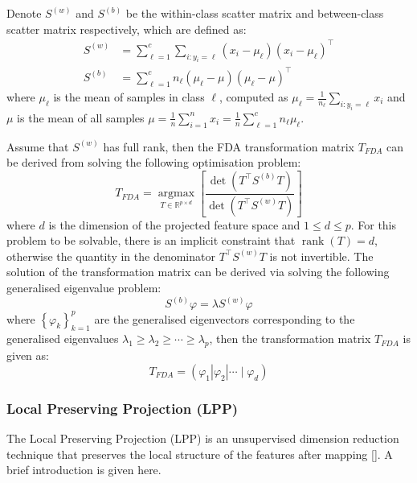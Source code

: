 \documentclass[a4paper,12pt]{article}
\begin{document}
Denote $S^{(w)}$ and $S^{(b)}$ be the within-class scatter matrix and between-class scatter matrix respectively, which are defined as:
\begin{align} 
S^{(w)} & = \sum_{\ell=1}^{c} \sum_{i: y_{i}=\ell}\left(x_{i}-\mu_{\ell}\right)\left(x_{i}-\mu_{\ell}\right)^{\top} \label{sw}\\
S^{(b)} & = \sum_{\ell=1}^{c} n_{\ell}\left(\mu_{\ell}-\mu\right)\left(\mu_{\ell}-\mu\right)^{\top} \label{sb}
\end{align}
where $\mu_{\ell}$ is the mean of samples in class $\ell$, computed as $\mu_{\ell} = \frac{1}{n_{\ell}} \sum_{i: y_{i}=\ell} x_{i}$ and $\mu$ is the mean of all samples $\mu = \frac{1}{n} \sum_{i=1}^{n} x_{i}=\frac{1}{n} \sum_{\ell=1}^{c} n_{\ell} \mu_{\ell}$.

Assume that $S^{(w)}$ has full rank, then the FDA transformation matrix $T_{F D A}$ can be derived from solving the following optimisation problem:
\begin{equation*}
T_{F D A}=\underset{T \in \mathbb{R}^{p \times d}}{\operatorname{argmax}}\left[\frac{\operatorname{det}\left(T^{\top} S^{(b)} T\right)}{\operatorname{det}\left(T^{\top} S^{(w)} T\right)}\right]
\end{equation*}
where $d$ is the dimension of the projected feature space and $1 \leq d \leq p$. For this problem to be solvable, there is an implicit constraint that $\operatorname{rank}(T)=d$, otherwise the quantity in the denominator $T^{\top} S^{(w)} T$ is not invertible. The solution of the transformation matrix can be derived via solving the following generalised eigenvalue problem:
\begin{equation*}
S^{(b)} \varphi=\lambda S^{(w)} \varphi
\end{equation*}
where $\left\{\varphi_{k}\right\}_{k=1}^{p}$ are the generalised eigenvectors corresponding to the generalised eigenvalues $\lambda_{1} \geq \lambda_{2} \geq \cdots \geq \lambda_{p}$, then the transformation matrix $T_{F D A}$ is given as:
\begin{equation*}
T_{F D A}=\left(\varphi_{1}\left|\varphi_{2}\right| \cdots \mid \varphi_{d}\right)
\end{equation*}

\subsubsection{Local Preserving Projection (LPP)}
The Local Preserving Projection (LPP) is an unsupervised dimension reduction technique that preserves the local structure of the features after mapping [\cite{he2004locality}]. A brief introduction is given here.
\end{document}
